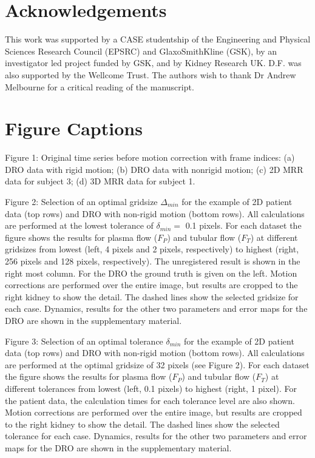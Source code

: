 \documentclass[num-refs]{wiley-article}
\begin{document}
\section*{Acknowledgements}
This work was supported by a CASE studentship of the Engineering and Physical Sciences Research Council (EPSRC) and GlaxoSmithKline (GSK), by an investigator led project funded by GSK, and by Kidney Research UK. D.F. was also supported by the Wellcome Trust. The authors wish to thank Dr Andrew Melbourne for a critical reading of the manuscript.

\section*{Figure Captions}

\noindent Figure 1: Original time series before motion correction with frame indices: (a) DRO data with rigid motion; (b) DRO data with nonrigid motion; (c) 2D MRR data for subject 3; (d) 3D MRR data for subject 1.

\noindent Figure 2: Selection of an optimal gridsize $\Delta_{min}$ for the example of 2D patient data (top rows) and DRO with non-rigid motion (bottom rows). All calculations are performed at the lowest tolerance of $\delta_{min}=$ 0.1 pixels. For each dataset the figure shows the results for plasma flow ($F_P$) and tubular flow ($F_T$) at different gridsizes from lowest (left, 4 pixels and 2 pixels, respectively) to highest (right, 256 pixels and 128 pixels, respectively). The unregistered result is shown in the right most column. For the DRO the ground truth is given on the left. Motion corrections are performed over the entire image, but results are cropped to the right kidney to show the detail. The dashed lines show the selected gridsize for each case. Dynamics, results for the other two parameters and error maps for the DRO are shown in the supplementary material.

\noindent Figure 3: Selection of an optimal tolerance $\delta_{min}$ for the example of 2D patient data (top rows) and DRO with non-rigid motion (bottom rows). All calculations are performed at the optimal gridsize of 32 pixels (see Figure 2). For each dataset the figure shows the results for plasma flow ($F_P$) and tubular flow ($F_T$) at different tolerances from lowest (left, 0.1 pixels) to highest (right, 1 pixel). For the patient data, the calculation times for each tolerance level are also shown. Motion corrections are performed over the entire image, but results are cropped to the right kidney to show the detail. The dashed lines show the selected tolerance for each case. Dynamics, results for the other two parameters and error maps for the DRO are shown in the supplementary material.
\end{document}
